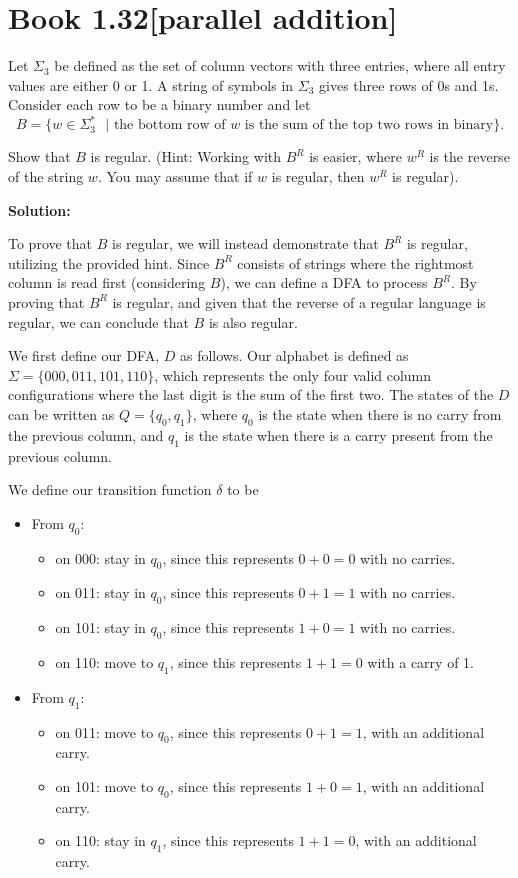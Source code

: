 \documentclass[11pt]{article}
\newenvironment{question}[2]
{\newpage\section{#1\texorpdfstring{\hfill}{horizontal spacing}{\rm\normalsize #2}}}{}
\newenvironment{solution}
{\textbf{Solution: }\color{blue}}
{\color{black}}
\begin{document}

\begin{question}{Book 1.32}{[parallel addition]}
Let \(\Sigma_3\) be defined as the set of column vectors with three entries, where all entry values are either 0 or 1. A string of symbols in \(\Sigma_3\) gives three rows of 0s and 1s. Consider each row to be a binary number and let
\[B = \{w \in \Sigma_{3}^{*} \text{ } | \text{ the bottom row of } w \text{ is the sum of the top two rows in binary}\}.\]

Show that \(B\) is regular. (Hint: Working with \(B^{R}\) is easier, where \(w^{R}\) is the reverse of the string \(w\). You may assume that if \(w\) is regular, then \(w^{R}\) is regular).

\begin{solution}

To prove that \(B\) is regular, we will instead demonstrate that \(B^{R}\) is regular, utilizing the provided hint. Since \(B^{R}\) consists of strings where the rightmost column is read first (considering \(B\)), we can define a DFA to process \(B^{R}\). By proving that \(B^{R}\) is regular, and given that the reverse of a regular language is regular, we can conclude that \(B\) is also regular.

We first define our DFA, \(D\) as follows. Our alphabet is defined as \(\Sigma = \{000, 011, 101, 110\}\), which represents the only four valid column configurations where the last digit is the sum of the first two. The states of the \(D\) can be written as \(Q = \{q_0, q_1\}\), where \(q_0\) is the state when there is no carry from the previous column, and \(q_1\) is the state when there is a carry present from the previous column.

We define our transition function \(\delta\) to be
\begin{itemize}
    \item From \(q_0\):
    \begin{itemize}
        \item on 000: stay in \(q_0\), since this represents \(0+0=0\) with no carries.
        \item on 011: stay in \(q_0\), since this represents \(0+1=1\) with no carries.
        \item on 101: stay in \(q_0\), since this represents \(1+0=1\) with no carries.
        \item on 110: move to \(q_1\), since this represents \(1+1=0\) with a carry of 1.
    \end{itemize}
    \item From \(q_1\):
    \begin{itemize}
        \item on 011: move to \(q_0\), since this represents \(0+1=1\), with an additional carry.
        \item on 101: move to \(q_0\), since this represents \(1+0=1\), with an additional carry.
        \item on 110: stay in \(q_1\), since this represents \(1+1=0\), with an additional carry.
    \end{itemize}
\end{itemize}


\end{solution}
\end{question}
\end{document}
